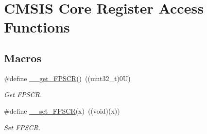 \hypertarget{group___c_m_s_i_s___core___reg_acc_functions}{}\section{C\+M\+S\+IS Core Register Access Functions}
\label{group___c_m_s_i_s___core___reg_acc_functions}
\subsection*{Macros}
\begin{DoxyCompactItemize}
\item 
\#define \mbox{\hyperlink{group___c_m_s_i_s___core___reg_acc_functions_ga4d0739b1355ca5642a7ce76df1271f01}{\+\_\+\+\_\+get\+\_\+\+F\+P\+S\+CR}}()~((uint32\+\_\+t)0\+U)
\begin{DoxyCompactList}\small\item\em Get F\+P\+S\+CR. \end{DoxyCompactList}\item 
\#define \mbox{\hyperlink{group___c_m_s_i_s___core___reg_acc_functions_ga3cd91c42ad2793c3f3ae553a1b975512}{\+\_\+\+\_\+set\+\_\+\+F\+P\+S\+CR}}(x)~((void)(x))
\begin{DoxyCompactList}\small\item\em Set F\+P\+S\+CR. \end{DoxyCompactList}\end{DoxyCompactItemize}
